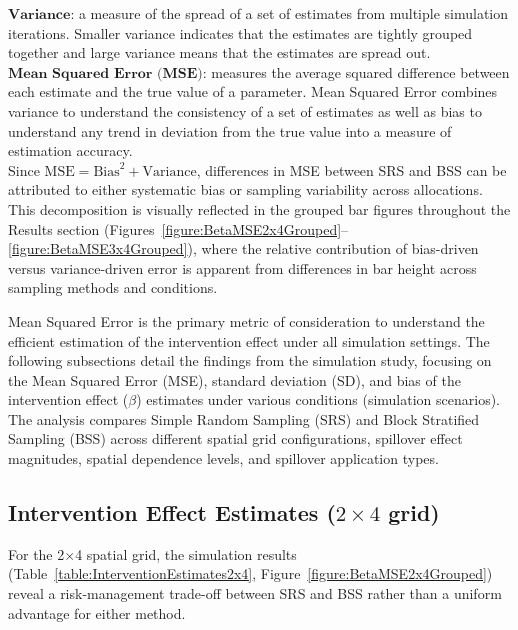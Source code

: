 \documentclass{article}[11pt]
\begin{document}
\noindent $\textbf{Variance}$: a measure of the spread of a set of estimates from multiple simulation iterations. Smaller variance indicates that the estimates are tightly grouped together and large variance means that the estimates are spread out.\\

\noindent $\textbf{Mean Squared Error (MSE)}$: measures the average squared difference between each estimate and the true value of a parameter. Mean Squared Error combines variance to understand the consistency of a set of estimates as well as bias to understand any trend in deviation from the true value into a measure of estimation accuracy.\\

Since $\text{MSE} = \text{Bias}^2 + \text{Variance}$, differences in MSE between SRS and BSS can be attributed to either systematic bias or sampling variability across allocations. This decomposition is visually reflected in the grouped bar figures throughout the Results section (Figures~\ref{figure:BetaMSE2x4Grouped}--\ref{figure:BetaMSE3x4Grouped}), where the relative contribution of bias-driven versus variance-driven error is apparent from differences in bar height across sampling methods and conditions.

Mean Squared Error is the primary metric of consideration to understand the efficient estimation of the intervention effect under all simulation settings. The following subsections detail the findings from the simulation study, focusing on the Mean Squared Error (MSE), standard deviation (SD), and bias of the intervention effect ($\beta$) estimates under various conditions (simulation scenarios). The analysis compares Simple Random Sampling (SRS) and Block Stratified Sampling (BSS) across different spatial grid configurations, spillover effect magnitudes, spatial dependence levels, and spillover application types.

\subsection{Intervention Effect Estimates ($2\times4$ grid)}

For the 2$\times$4 spatial grid, the simulation results (Table~\ref{table:InterventionEstimates2x4}, Figure~\ref{figure:BetaMSE2x4Grouped}) reveal a risk-management trade-off between SRS and BSS rather than a uniform advantage for either method.
\end{document}
